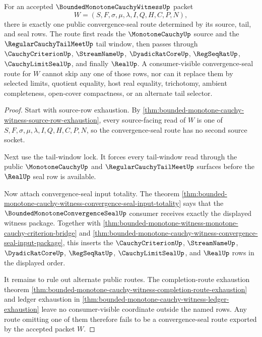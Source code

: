 \begin{theorem}
\label{thm:bounded-monotone-cauchy-witness-convergence-seal-route-determinacy}
For an accepted $\BoundedMonotoneCauchyWitnessUp$ packet
$$
W=(S,F,\sigma,\mu,\lambda,I,Q,H,C,P,N),
$$
there is exactly one public convergence-seal route determined by its source, tail, and seal rows. The route first reads the $\MonotoneCauchyUp$ source and the $\RegularCauchyTailMeetUp$ tail window, then passes through $\CauchyCriterionUp$, $\StreamNameUp$, $\DyadicRatCoreUp$, $\RegSeqRatUp$, $\CauchyLimitSealUp$, and finally $\RealUp$. A consumer-visible convergence-seal route for $W$ cannot skip any one of those rows, nor can it replace them by selected limits, quotient equality, host real equality, trichotomy, ambient completeness, open-cover compactness, or an alternate tail selector.
\end{theorem}
\begin{proof}
Start with source-row exhaustion. By \autoref{thm:bounded-monotone-cauchy-witness-source-row-exhaustion}, every source-facing read of $W$ is one of $S,F,\sigma,\mu,\lambda,I,Q,H,C,P,N$, so the convergence-seal route has no second source socket.

Next use the tail-window lock. It forces every tail-window read through the public $\MonotoneCauchyUp$ and $\RegularCauchyTailMeetUp$ surfaces before the $\RealUp$ seal row is available.

Now attach convergence-seal input totality. The theorem \autoref{thm:bounded-monotone-cauchy-witness-convergence-seal-input-totality} says that the $\BoundedMonotoneConvergenceSealUp$ consumer receives exactly the displayed witness package. Together with \autoref{thm:bounded-monotone-witness-monotone-cauchy-criterion-bridge} and \autoref{thm:bounded-monotone-cauchy-witness-convergence-seal-input-package}, this inserts the $\CauchyCriterionUp$, $\StreamNameUp$, $\DyadicRatCoreUp$, $\RegSeqRatUp$, $\CauchyLimitSealUp$, and $\RealUp$ rows in the displayed order.

It remains to rule out alternate public routes. The completion-route exhaustion theorem \autoref{thm:bounded-monotone-cauchy-witness-completion-route-exhaustion} and ledger exhaustion in \autoref{thm:bounded-monotone-cauchy-witness-ledger-exhaustion} leave no consumer-visible coordinate outside the named rows. Any route omitting one of them therefore fails to be a convergence-seal route exported by the accepted packet $W$.
\end{proof}

